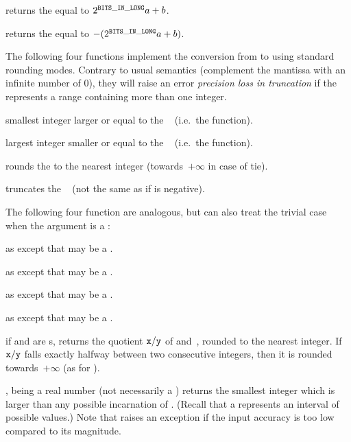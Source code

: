  returns the  equal to
$2^{{\tt BITS\_IN\_LONG}} a + b$.

 returns the  equal to
$-(2^{{\tt BITS\_IN\_LONG}} a + b)$.

The following four functions implement the conversion from  to
 using standard rounding modes. Contrary to usual semantics
(complement the mantissa with an infinite number of 0), they will raise an
error \emph{precision loss in truncation} if the  represents a
range containing more than one integer.

 smallest integer larger or equal
to the ~ (i.e.~the  function).

 largest integer smaller or equal to the
~ (i.e.~the  function).

 rounds the   to the nearest integer
(towards~$+\infty$ in case of tie).

 truncates the ~ (not the same as
 if  is negative).

The following four function are analogous, but can also treat the trivial
case when the argument is a :

as  except that  may be a .

as  except that  may be a .

as  except that  may be a .

as  except that  may be a .

 if  and  are s,
returns the quotient ${\tt x}/{\tt y}$ of  and~, rounded to
the nearest integer. If ${\tt x}/{\tt y}$ falls exactly halfway between
two consecutive integers, then it is rounded towards~$+\infty$ (as for
).

,  being a real number (not necessarily a
) returns the smallest integer which is larger than any possible
incarnation of . (Recall that a  represents an interval of
possible values.) Note that  raises an exception if the input
accuracy is too low compared to its magnitude.

